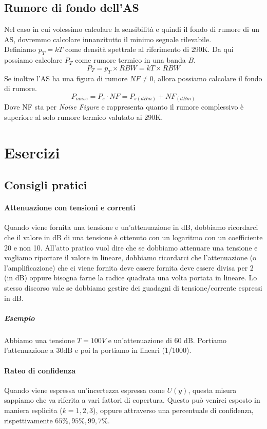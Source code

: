 \documentclass{article}
\begin{document}
	\subsection*{Rumore di fondo dell'AS}
	Nel caso in cui volessimo calcolare la sensibilità e quindi il fondo di rumore di un AS, dovremmo calcolare innanzitutto il minimo segnale rilevabile.\\
	Definiamo $p_T = kT$ come densità spettrale al riferimento di 290K.
	Da qui possiamo calcolare $P_T$ come rumore termico in una banda $B$.
	\begin{equation}
		P_T = p_T \times RBW = kT \times RBW
	\end{equation}
	Se inoltre l'AS ha una figura di rumore $NF \neq 0$, allora possiamo calcolare il fondo di rumore.
	\begin{equation}
		P_{noise} = P_s \cdot NF = P_{s (dBm)} + NF_{(dBm)}
	\end{equation}
	Dove NF sta per \textit{Noise Figure} e rappresenta quanto il rumore complessivo è superiore al solo rumore termico valutato ai 290K.
	
	\newpage
	\section*{Esercizi}
	\subsection*{Consigli pratici}
	\paragraph*{Attenuazione con tensioni e correnti}
	Quando viene fornita una tensione e un'attenuazione in dB, dobbiamo ricordarci che il valore in dB di una tensione è ottenuto con un logaritmo con un coefficiente 20 e non 10. All'atto pratico vuol dire che se dobbiamo attenuare una tensione e vogliamo riportare il valore in lineare, dobbiamo ricordarci che l'attenuazione (o l'amplificazione) che ci viene fornita deve essere fornita deve essere divisa per 2 (in dB) oppure bisogna farne la radice quadrata una volta portata in lineare. Lo stesso discorso vale se dobbiamo gestire dei guadagni di tensione/corrente espressi in dB.
	\subparagraph*{Esempio}
	Abbiamo una tensione $T = 100V$ e un'attenuazione di 60 dB. Portiamo l'attenuazione a 30dB e poi la portiamo in lineari (1/1000).
	\paragraph*{Rateo di confidenza}
	Quando viene espressa un'incertezza espressa come $U(y)$, questa misura sappiamo che va riferita a vari fattori di copertura. Questo può venirci esposto in maniera esplicita ($k = 1,2,3$), oppure attraverso una percentuale di confidenza, rispettivamente $65\%, 95\%, 99,7\%$.
\end{document}
